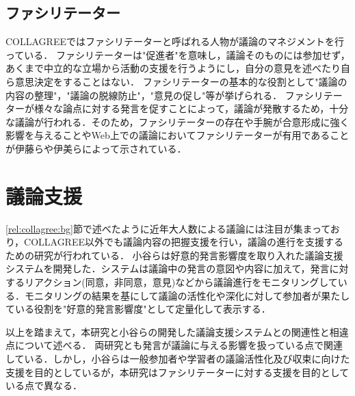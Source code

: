 \subsection{ファシリテーター}
COLLAGREEではファシリテーターと呼ばれる人物が議論のマネジメントを行っている．
ファシリテーターは"促進者"を意味し，議論そのものには参加せず，あくまで中立的な立場から活動の支援を行うようにし，自分の意見を述べたり自ら意思決定をすることはない．
ファシリテーターの基本的な役割として"議論の内容の整理"，"議論の脱線防止"，"意見の促し"等が挙げられる．
ファシリテーターが様々な論点に対する発言を促すことによって，議論が発散するため，十分な議論が行われる．そのため，ファシリテーターの存在や手腕が合意形成に強く影響を与えることやWeb上での議論においてファシリテーターが有用であることが伊藤ら\cite{facilitation}や伊美ら\cite{collagree_Experiment}によって示されている．

\section{議論支援}
\label{rel:argSupport}
\ref{rel:collagree:bg}節で述べたように近年大人数による議論には注目が集まっており，COLLAGREE以外でも議論内容の把握支援を行い，議論の進行を支援するための研究が行われている．
小谷ら\cite{discSupport2}は好意的発言影響度を取り入れた議論支援システムを開発した．システムは議論中の発言の意図や内容に加えて，発言に対するリアクション(同意，非同意，意見)などから議論進行をモニタリングしている．モニタリングの結果を基にして議論の活性化や深化に対して参加者が果たしている役割を"好意的発言影響度"として定量化して表示する．

以上を踏まえて，本研究と小谷らの開発した議論支援システムとの関連性と相違点について述べる．
両研究とも発言が議論に与える影響を扱っている点で関連している．しかし，小谷らは一般参加者や学習者の議論活性化及び収束に向けた支援を目的としているが，本研究はファシリテーターに対する支援を目的としている点で異なる．
